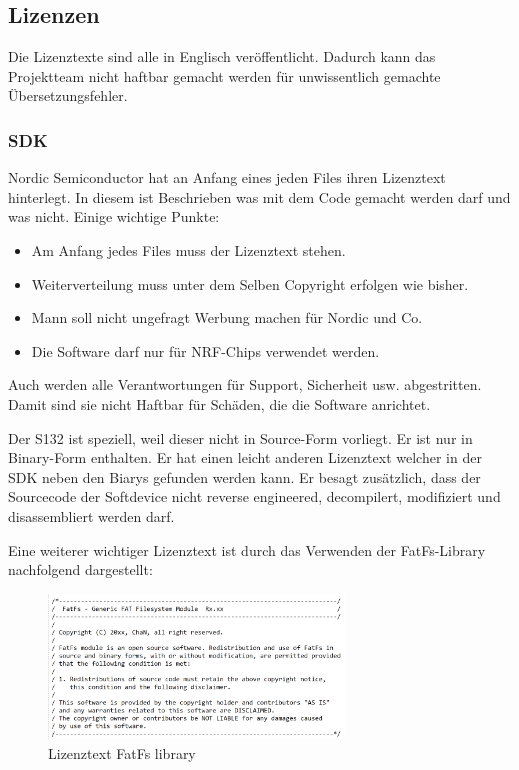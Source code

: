 \subsection{Lizenzen}\label{sec:lizenzen}
Die Lizenztexte sind alle in Englisch veröffentlicht. Dadurch kann das Projektteam nicht haftbar gemacht werden für unwissentlich gemachte Übersetzungsfehler.

\subsubsection*{SDK}
Nordic Semiconductor hat an Anfang eines jeden Files ihren Lizenztext \cite{nordic_sdk_license} hinterlegt. In diesem ist Beschrieben was mit dem Code gemacht werden darf und was nicht. Einige wichtige Punkte:

\begin{itemize}
	\item Am Anfang jedes Files muss der Lizenztext stehen.
	\item Weiterverteilung muss unter dem Selben Copyright erfolgen wie bisher.
	\item Mann soll nicht ungefragt Werbung machen für Nordic und Co.
	\item Die Software darf nur für NRF-Chips verwendet werden.
\end{itemize}

Auch werden alle Verantwortungen für Support, Sicherheit usw. abgestritten. Damit sind sie nicht Haftbar für Schäden, die die Software anrichtet.

Der S132 ist speziell, weil dieser nicht in Source-Form vorliegt. Er ist nur in Binary-Form enthalten. Er hat einen leicht anderen Lizenztext welcher in der SDK neben den Biarys gefunden werden kann. Er besagt zusätzlich, dass der Sourcecode der Softdevice nicht reverse engineered, decompilert, modifiziert und disassembliert werden darf.

Eine weiterer wichtiger Lizenztext ist durch das Verwenden der FatFs-Library nachfolgend dargestellt:

\begin{figure}[H]
	\begin{center}
		\includegraphics[width=0.7\textwidth]{data/Lizenztext_FatFs.png}
		\caption{Lizenztext FatFs library} %
		\label{fig:Lizentext FatFs}
	\end{center}
\end{figure}






